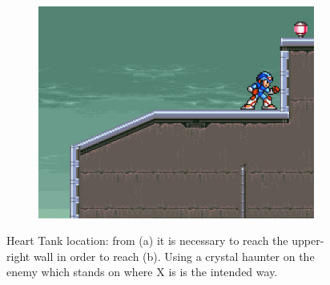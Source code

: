 \begin{figure}[htp]
\begin{subfigure}{0.4\linewidth}
		\includegraphics[width=\linewidth]{figures/X2/Morph_moth/Moth_heart_2.jpg}
		\caption{}	
	\end{subfigure}
	\caption{Heart Tank location: from (a) it is necessary to reach the upper-right wall in order to reach (b). Using a crystal haunter on the enemy which stands on where X is is the intended way.}
\end{figure}


